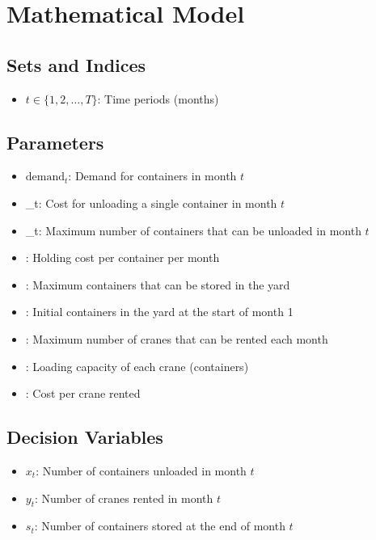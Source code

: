\documentclass{article}
\begin{document}
\section*{Mathematical Model}

\subsection*{Sets and Indices}
\begin{itemize}
    \item $t \in \{1, 2, \ldots, T\}$: Time periods (months)
\end{itemize}

\subsection*{Parameters}
\begin{itemize}
    \item $\text{demand}_t$: Demand for containers in month $t$
    \item {}_t: Cost for unloading a single container in month $t$
    \item {}_t: Maximum number of containers that can be unloaded in month $t$
    \item {}: Holding cost per container per month
    \item {}: Maximum containers that can be stored in the yard
    \item {}: Initial containers in the yard at the start of month 1
    \item {}: Maximum number of cranes that can be rented each month
    \item {}: Loading capacity of each crane (containers)
    \item {}: Cost per crane rented
\end{itemize}

\subsection*{Decision Variables}
\begin{itemize}
    \item $x_t$: Number of containers unloaded in month $t$
    \item $y_t$: Number of cranes rented in month $t$
    \item $s_t$: Number of containers stored at the end of month $t$
\end{itemize}
\end{document}
